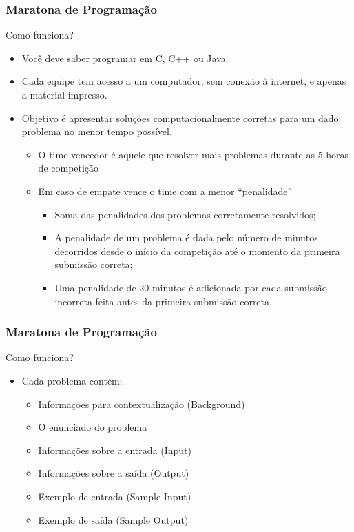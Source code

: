 \begin{frame}
\frametitle{Maratona de Programação}
\begin{block}{Como funciona?}
\begin{itemize}
	\item Você deve saber programar em C, C++ ou Java.
	\item Cada equipe tem acesso a um computador, sem conexão à internet, e apenas a material impresso.
	\item Objetivo é apresentar soluções computacionalmente corretas para um dado problema no menor tempo possível.
	\begin{itemize}
		\item O time vencedor é aquele que resolver mais problemas durante as 5 horas de competição
		\item Em caso de empate vence o time com a menor ``penalidade''
		\begin{itemize}
			\item Soma das penalidades dos problemas corretamente resolvidos;
			\item A penalidade de um problema é dada pelo número de minutos decorridos desde o início da competição até o momento da primeira submissão correta;
			\item Uma penalidade de 20 minutos é adicionada por cada submissão incorreta feita antes da primeira submissão correta.
		\end{itemize}
   	\end{itemize}
\end{itemize}
\end{block}
\end{frame}

\begin{frame}
\frametitle{Maratona de Programação}
\begin{block}{Como funciona?}
\begin{itemize}
	\item Cada problema contém:
	\begin{itemize}
		\item Informações para contextualização (Background)
		\item O enunciado do problema
		\item Informações sobre a entrada (Input)
		\item Informações sobre a saída (Output)
		\item Exemplo de entrada (Sample Input)
		\item Exemplo de saída (Sample Output)
	\end{itemize}
\end{itemize}
\end{block}
\end{frame}

